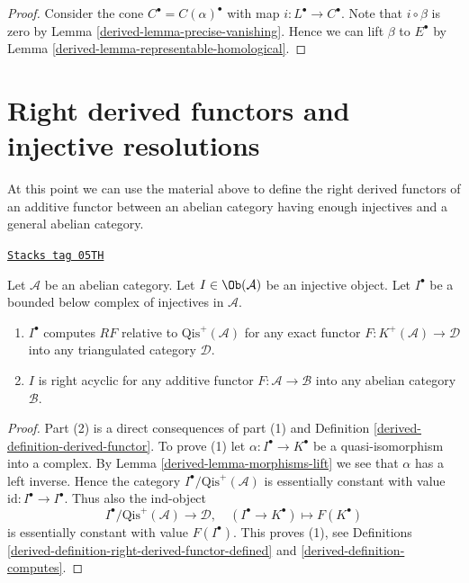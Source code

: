 \begin{proof}

Consider the cone $C^\bullet = C(\alpha)^\bullet$ with map
$i : L^\bullet \to C^\bullet$.
Note that $i \circ \beta$ is zero by
Lemma \ref{derived-lemma-precise-vanishing}.
Hence we can lift $\beta$ to $E^\bullet$ by
Lemma \ref{derived-lemma-representable-homological}.
\end{proof}

\section{Right derived functors and injective resolutions}
\label{derived-section-right-derived-functor}
At this point we can use the material above to define the right derived
functors of an additive functor between an abelian category having
enough injectives and a general abelian category.

\begin{lemma}
\label{derived-lemma-injective-acyclic}
\href{https://stacks.math.columbia.edu/tag/05TH}{\texttt{Stacks tag 05TH}}

Let $\mathcal{A}$ be an abelian category.
Let $I \in \Ob(\mathcal{A})$ be an injective object.
Let $I^\bullet$ be a bounded below complex of injectives in $\mathcal{A}$.
\begin{enumerate}
\item $I^\bullet$ computes $RF$ relative to $\text{Qis}^{+}(\mathcal{A})$
for any exact functor $F : K^{+}(\mathcal{A}) \to \mathcal{D}$
into any triangulated category $\mathcal{D}$.
\item $I$ is right acyclic for any additive functor
$F : \mathcal{A} \to \mathcal{B}$ into any abelian category $\mathcal{B}$.
\end{enumerate}
\end{lemma}

\begin{proof}

Part (2) is a direct consequences of part (1) and
Definition \ref{derived-definition-derived-functor}.
To prove (1) let $\alpha : I^\bullet \to K^\bullet$ be a quasi-isomorphism
into a complex. By
Lemma \ref{derived-lemma-morphisms-lift}
we see that $\alpha$ has a left inverse. Hence the category
$I^\bullet/\text{Qis}^{+}(\mathcal{A})$ is essentially constant with value
$\text{id} : I^\bullet \to I^\bullet$. Thus also the ind-object
$$
I^\bullet/\text{Qis}^{+}(\mathcal{A}) \longrightarrow \mathcal{D}, \quad
(I^\bullet \to K^\bullet) \longmapsto F(K^\bullet)
$$
is essentially constant with value $F(I^\bullet)$. This proves (1), see
Definitions \ref{derived-definition-right-derived-functor-defined} and
\ref{derived-definition-computes}.
\end{proof}

